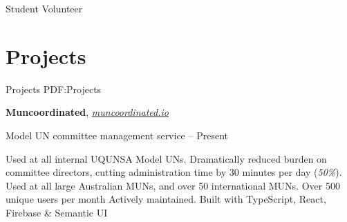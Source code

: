 \documentclass[a4paper,10pt,oneside]{article}
\begin{document}
\begin{minipage}[t][0pt]{\linewidth}
\begin{body}
\par Student Volunteer\hfill {} 

\begin{detail}
\end{detail}




\section
{Projects}
{Projects}
{PDF:Projects}

\textbf{Muncoordinated}, \href{https://muncoordinated.io}{\textit{muncoordinated.io}}
\par Model UN committee management service\hfill {} -- Present
\begin{detail}
	\BulletItem Used at all internal UQUNSA Model UNs. Dramatically reduced burden on committee directors, cutting administration time by 30 minutes per day (\textit{50\%}). Used at all large Australian MUNs, and over 50 international MUNs. Over 500 unique users per month
	\BulletItem Actively maintained. Built with TypeScript, React, Firebase \& Semantic UI
\end{detail}

\EntryGap



\end{body}
\end{minipage}
\end{document}

